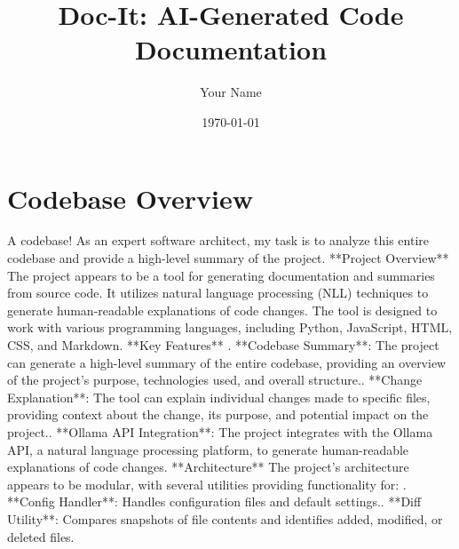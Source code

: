 \documentclass{article}%
\title{Doc{-}It: AI{-}Generated Code Documentation}%
\author{Your Name}%
\date{\today}%
\begin{document}
%
\normalsize%
\maketitle%
\section{Codebase Overview}%
\label{sec:CodebaseOverview}%
A codebase!\newline%
\newline%
As an expert software architect, my task is to analyze this entire codebase and provide a high{-}level summary of the project.\newline%
\newline%
**Project Overview**\newline%
\newline%
The project appears to be a tool for generating documentation and summaries from source code. It utilizes natural language processing (NLL) techniques to generate human{-}readable explanations of code changes. The tool is designed to work with various programming languages, including Python, JavaScript, HTML, CSS, and Markdown.\newline%
\newline%
**Key Features**\newline%
. **Codebase Summary**: The project can generate a high{-}level summary of the entire codebase, providing an overview of the project's purpose, technologies used, and overall structure.. **Change Explanation**: The tool can explain individual changes made to specific files, providing context about the change, its purpose, and potential impact on the project.. **Ollama API Integration**: The project integrates with the Ollama API, a natural language processing platform, to generate human{-}readable explanations of code changes.\newline%
\newline%
**Architecture**\newline%
\newline%
The project's architecture appears to be modular, with several utilities providing functionality for:\newline%
. **Config Handler**: Handles configuration files and default settings.. **Diff Utility**: Compares snapshots of file contents and identifies added, modified, or deleted files.\newline%
\end{document}
